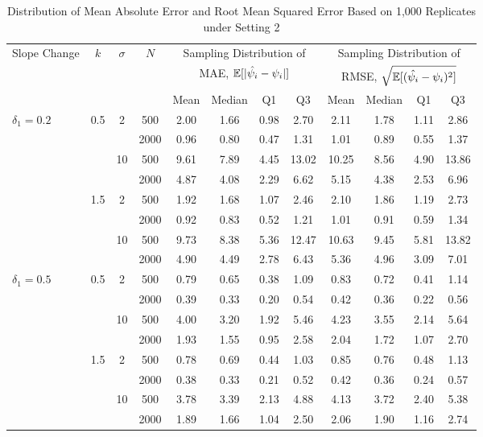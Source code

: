 \documentclass [12pt, proquest] {uwthesis}[2016/11/22]
\begin{document}
\begin{table}
\centering
\renewcommand\arraystretch{0.75}
\begin{tabular}{@{} lccccccccccc @{}} 
\toprule
    {Slope Change} & {$k$} & $\sigma$ & $N$ & \multicolumn{4}{c}{Sampling Distribution of} & \multicolumn{4}{c}{Sampling Distribution of} \\
    & & & & \multicolumn{4}{c}{MAE, $\mathbb{E}[\lvert \Hat{\psi_i} - \psi_i \rvert]$} & \multicolumn{4}{c}{RMSE, $\sqrt{\mathbb{E}[(\Hat{\psi_i} - \psi_i)^2]}$}\\
    \cmidrule(lr){5-8} \cmidrule(lr){9-12}
     & & & & Mean & Median & Q1 & Q3 & Mean & Median & Q1 & Q3 \\
\midrule
    $\delta_1 = 0.2$ & 0.5 & 2 & 500 & 2.00 & 1.66 & 0.98 & 2.70 & 2.11 & 1.78 & 1.11 & 2.86 \\
                     &     &   & 2000 & 0.96 & 0.80 & 0.47 & 1.31 & 1.01 & 0.89 & 0.55 & 1.37  \\
                     &     & 10 & 500 & 9.61 & 7.89 & 4.45 & 13.02 & 10.25 & 8.56 & 4.90 & 13.86 \\
                     &     &    & 2000 & 4.87 & 4.08 & 2.29 & 6.62 & 5.15 & 4.38 & 2.53 & 6.96 \\
                     & 1.5 & 2 & 500 & 1.92 & 1.68 & 1.07 & 2.46 & 2.10 & 1.86 & 1.19 & 2.73 \\
                     &     &   & 2000 & 0.92 & 0.83 & 0.52 & 1.21 & 1.01 & 0.91 & 0.59 & 1.34 \\
                     &     & 10 & 500 & 9.73 & 8.38 & 5.36 & 12.47 & 10.63 & 9.45 & 5.81 & 13.82\\
                     &     &    & 2000 & 4.90 & 4.49 & 2.78 & 6.43 & 5.36 & 4.96 & 3.09 & 7.01 \\
\midrule
    $\delta_1 = 0.5$ & 0.5 & 2 & 500 & 0.79 & 0.65 & 0.38 & 1.09 & 0.83 & 0.72 & 0.41 & 1.14  \\
                     &     &   & 2000 & 0.39 & 0.33 & 0.20 & 0.54 & 0.42 & 0.36 & 0.22 & 0.56 \\
                     &     & 10 & 500 & 4.00 & 3.20 & 1.92 & 5.46 & 4.23 & 3.55 & 2.14 & 5.64 \\
                     &     &     & 2000 & 1.93 & 1.55 & 0.95 & 2.58 & 2.04 & 1.72 & 1.07 & 2.70 \\
                     & 1.5 & 2 & 500 & 0.78 & 0.69 & 0.44 & 1.03 & 0.85 & 0.76 & 0.48 & 1.13 \\
                     &     &     & 2000 & 0.38 & 0.33 & 0.21 & 0.52 & 0.42 & 0.36 & 0.24 & 0.57 \\
                     &     & 10 & 500 & 3.78 & 3.39 & 2.13 & 4.88 & 4.13 & 3.72 & 2.40 & 5.38 \\
                     &     &     & 2000 & 1.89 & 1.66 & 1.04 & 2.50 & 2.06 & 1.90 & 1.16 & 2.74 \\    
\bottomrule
\end{tabular}
\caption{Distribution of Mean Absolute Error and Root Mean Squared Error Based on 1,000 Replicates under Setting 2}
\end{table}
\end{document}
